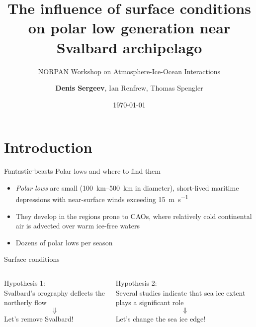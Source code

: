 \documentclass[10pt]{beamer}
\title{The influence of surface conditions on polar low generation near Svalbard archipelago}
\subtitle{\small{NORPAN Workshop on Atmosphere-Ice-Ocean Interactions}}
\date{\today}
\author{\textbf{Denis Sergeev}, Ian Renfrew, Thomas Spengler}
\begin{document}
\maketitle


\section{Introduction}
\begin{frame}{\sout{Fantastic beasts} Polar lows and where to find them}
\begin{itemize}
\item \textit{Polar lows} are small (\SIrange{100}{500}{\km} in diameter), short-lived maritime depressions with near-surface winds exceeding \SI{15}{\meter\per\s}
\item They develop in the regions prone to CAOs, where relatively cold continental air is advected over warm ice-free waters
\item Dozens of polar lows per season
\end{itemize}
\end{frame}

\begin{frame}{A polar low near Lofoten Islands}
\begin{center}
\texttt{[image: \{figures/PL\_19122014\_Lofoten]}.jpg}
\end{center}
\end{frame}

\begin{frame}{Surface conditions}
\begin{columns}
\begin{column}{0.5\textwidth}
Hypothesis 1:\\
Svalbard's orography deflects the northerly flow\\
$$\Downarrow$$
Let's remove Svalbard!
\end{column}
\begin{column}{0.5\textwidth}
Hypothesis 2:\\
Several studies indicate that sea ice extent plays a significant role\\
$$\Downarrow$$
Let's change the sea ice edge!
\end{column}
\end{columns}
\end{frame}
\end{document}
